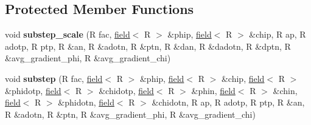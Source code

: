 \subsection*{Protected Member Functions}
\begin{DoxyCompactItemize}
\item 
\hypertarget{classrk4_a32ca7b0812b646d626ef2581e9a7558d}{
void {\bfseries substep\_\-scale} (R fac, \hyperlink{classfield}{field}$<$ R $>$ \&phip, \hyperlink{classfield}{field}$<$ R $>$ \&chip, R ap, R adotp, R ptp, R \&an, R \&adotn, R \&ptn, R \&dan, R \&dadotn, R \&dptn, R \&avg\_\-gradient\_\-phi, R \&avg\_\-gradient\_\-chi)}
\label{classrk4_a32ca7b0812b646d626ef2581e9a7558d}

\item 
\hypertarget{classrk4_ab6588276335620de871fadf2065059b9}{
void {\bfseries substep} (R fac, \hyperlink{classfield}{field}$<$ R $>$ \&phip, \hyperlink{classfield}{field}$<$ R $>$ \&chip, \hyperlink{classfield}{field}$<$ R $>$ \&phidotp, \hyperlink{classfield}{field}$<$ R $>$ \&chidotp, \hyperlink{classfield}{field}$<$ R $>$ \&phin, \hyperlink{classfield}{field}$<$ R $>$ \&chin, \hyperlink{classfield}{field}$<$ R $>$ \&phidotn, \hyperlink{classfield}{field}$<$ R $>$ \&chidotn, R ap, R adotp, R ptp, R \&an, R \&adotn, R \&ptn, R \&avg\_\-gradient\_\-phi, R \&avg\_\-gradient\_\-chi)}
\label{classrk4_ab6588276335620de871fadf2065059b9}

\end{DoxyCompactItemize}
